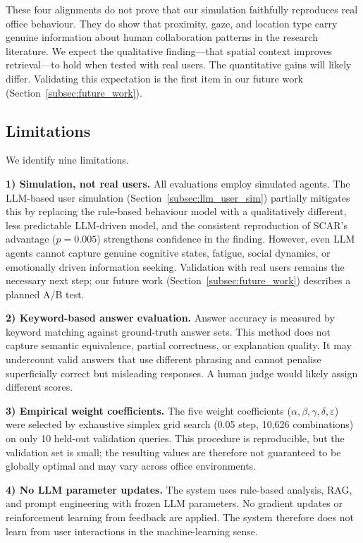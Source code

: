 \documentclass[journal]{IEEEtran}
\begin{document}
These four alignments do not prove that our simulation faithfully
reproduces real office behaviour. They do show that proximity, gaze,
and location type carry genuine information about human collaboration
patterns in the research literature. We expect the qualitative
finding---that spatial context improves retrieval---to hold when
tested with real users. The quantitative gains will likely differ.
Validating this expectation is the first item in our future work
(Section~\ref{subsec:future_work}).

\subsection{Limitations}
\label{subsec:limitations}

We identify nine limitations.

\textbf{1) Simulation, not real users.}
All evaluations employ simulated agents. The LLM-based user simulation (Section~\ref{subsec:llm_user_sim}) partially mitigates this by replacing the rule-based behaviour model with a qualitatively different, less predictable LLM-driven model, and the consistent reproduction of SCAR's advantage ($p = 0.005$) strengthens confidence in the finding. However, even LLM agents cannot capture genuine cognitive states, fatigue, social dynamics, or emotionally driven information seeking. Validation with real users remains the necessary next step; our future work (Section~\ref{subsec:future_work}) describes a planned A/B test.

\textbf{2) Keyword-based answer evaluation.}
Answer accuracy is measured by keyword matching against ground-truth answer sets. This method does not capture semantic equivalence, partial correctness, or explanation quality. It may undercount valid answers that use different phrasing and cannot penalise superficially correct but misleading responses. A human judge would likely assign different scores.

\textbf{3) Empirical weight coefficients.}
The five weight coefficients ($\alpha, \beta, \gamma, \delta, \varepsilon$) were selected by exhaustive simplex grid search (0.05 step, 10{,}626 combinations) on only 10 held-out validation queries. This procedure is reproducible, but the validation set is small; the resulting values are therefore not guaranteed to be globally optimal and may vary across office environments.

\textbf{4) No LLM parameter updates.}
The system uses rule-based analysis, RAG, and prompt engineering with frozen LLM parameters. No gradient updates or reinforcement learning from feedback are applied. The system therefore does not learn from user interactions in the machine-learning sense.
\end{document}
